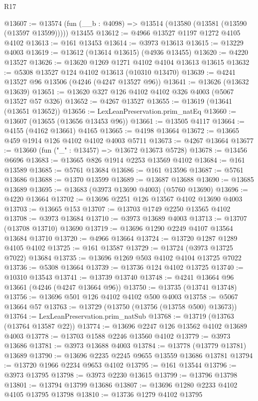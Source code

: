 \begin{lexlean}{R17}
\begin{coremodule}
@13607 := @13574 (fun (__b : @4098) => @13514 (@13580 (@13581 (@13590 (@13597 @13599))))) @13455
@13612 := @4966 @13527 @1197 @1272 @4105 @4102
@13613 := @161 @13453
@13614 := @3973 @13613
@13615 := @13229 @4003
@13619 := @13612 (@13614 @13615) (@4936 @13455)
@13620 := @4220 @13527
@13626 := @13620 @1269 @1271 @4102 @4104 @13613 @13615
@13632 := @5308 @13527 @124 @4102 @13613 (@10310 @13470)
@13639 := @4241 @13527 @96 @13506 (@4246 (@4247 @13527 @96))
@13641 := @13626 (@13632 @13639)
@13651 := @13620 @327 @126 @4102 @4102 @326 @4003 (@5067 @13527 @57 @326)
@13652 := @4267 @13527
@13655 := @13619 (@13641 (@13651 @13652))
@13656 := LexLeanPreservation.prim_natEq
@13660 := @13607 (@13655 (@13656 @13453 @96))
@13661 := @13505 @4117
@13664 := @4155 (@4162 @13661) @4165
@13665 := @4198 @13664
@13672 := @13665 @459 @1914 @126 @4102 @4102 @4003 @5711
@13673 := @4267 @13664
@13677 := @13660 (fun ("_" : @13457) => @13672 @13673 @5728)
@13678 := @13456 @6696
@13683 := @13665 @826 @1914 @2253 @13569 @4102
@13684 := @161 @13589
@13685 := @5761 @13684
@13686 := @161 @13596
@13687 := @5761 @13686
@13688 := @1370 @13599
@13689 := @13687 @13688
@13690 := @13685 @13689
@13695 := @13683 (@3973 @13690 @4003) (@5760 @13690)
@13696 := @4220 @13664
@13702 := @13696 @2251 @126 @13567 @4102 @13690 @4003
@13703 := @13665 @153
@13707 := @13703 @1749 @2250 @13565 @4102
@13708 := @3973 @13684
@13710 := @3973 @13689 @4003
@13713 := @13707 (@13708 @13710) @13690
@13719 := @13696 @1290 @2249 @4107 @13564 @13684 @13710
@13720 := @4966 @13664
@13724 := @13720 @1287 @1289 @4105 @4102
@13725 := @161 @13587
@13729 := @13724 (@3973 @13725 @7022) @13684
@13735 := @13696 @1269 @503 @4102 @4104 @13725 @7022
@13736 := @5308 @13664
@13739 := @13736 @124 @4102 @13725
@13740 := @10310 @13543
@13741 := @13739 @13740
@13748 := @4241 @13664 @96 @13661 (@4246 (@4247 @13664 @96))
@13750 := @13735 (@13741 @13748)
@13756 := @13696 @501 @126 @4102 @4102 @500 @4003
@13758 := @5067 @13664 @57
@13763 := @13729 (@13750 (@13756 (@13758 @500) @13673))
@13764 := LexLeanPreservation.prim_natSub
@13768 := @13719 (@13763 (@13764 @13587 @22))
@13774 := @13696 @2247 @126 @13562 @4102 @13689 @4003
@13778 := @13703 @1588 @2246 @13560 @4102
@13779 := @3973 @13686
@13781 := @3973 @13688 @4003
@13784 := @13778 (@13779 @13781) @13689
@13790 := @13696 @2235 @2245 @9655 @13559 @13686 @13781
@13794 := @13720 @1966 @2234 @9653 @4102
@13795 := @161 @13544
@13796 := @3973 @13795
@13798 := @3973 @2230 @13615
@13799 := @13796 @13798
@13801 := @13794 @13799 @13686
@13807 := @13696 @1280 @2233 @4102 @4105 @13795 @13798
@13810 := @13736 @1279 @4102 @13795

\end{coremodule}
\end{lexlean}
